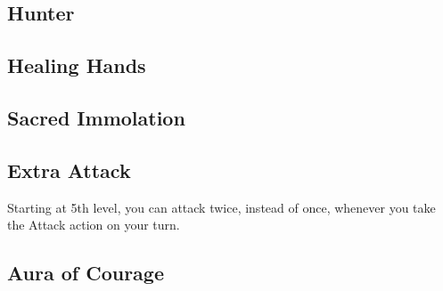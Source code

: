
\begin{multicols*}{2}

\section{Hunter}

\subsection*{Healing Hands}

\subsection*{Sacred Immolation}

\subsection*{Extra Attack}

Starting at 5th level, you can attack twice, instead of once, whenever you take the Attack action on your turn.

\subsection*{Aura of Courage}


\end{multicols*}
